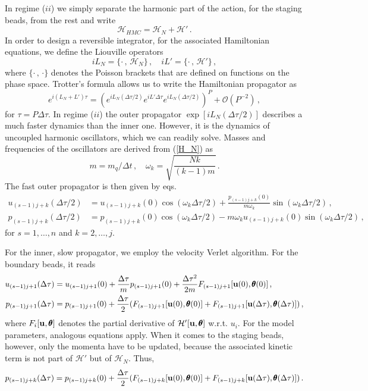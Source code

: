 \documentclass[11pt, a4paper]{article}
\newcommand{\vc}[1]{{\bf #1 }}
\begin{document}
In regime ($ii$) we simply separate the harmonic part of the action, for the staging beads, from the rest and write
\begin{equation}
  \mathcal H_{HMC}=\mathcal H_N + \mathcal H'\,.
\end{equation}
In order to design a reversible integrator, for the associated Hamiltonian equations, we define the Liouville operators
\begin{equation}
  iL_N=\{\cdot\,,\,\mathcal H_N\}\,,\quad
  iL'=\{\cdot\,,\,\mathcal H'\}\,,
\end{equation}
where $\{\cdot\,,\,\cdot\}$ denotes the Poisson brackets that are defined on functions on the phase space.
Trotter's formula allows us to write the Hamiltonian propagator as
\begin{equation}
  e^{i(L_N+L')\tau}
  =
  (e^{iL_N(\Delta\tau/2)}e^{iL'\Delta\tau}e^{iL_N(\Delta\tau/2)})^P
  +
  \mathcal O(P^{-2})\,,
\end{equation}
for $\tau =P\Delta \tau$.
In regime ($ii$) the outer propagator $\exp[iL_N(\Delta \tau/2)]$ describes a much faster dynamics than the inner one.
However, it is the dynamics of uncoupled harmonic oscillators, which we can readily solve.
Masses and frequencies of the oscillators are derived from (\ref{H_N}) as
\begin{equation}
  m=m_q/\Delta t\,,\quad
  \omega_k=\sqrt{\frac{Nk}{(k-1)m}}\,.
\end{equation}
The fast outer propagator is then given by eqs.
\begin{align}
  u_{(s-1)j+k}(\Delta\tau/2)
  &=
  u_{(s-1)j+k}(0)\cos(\omega_k\Delta\tau/2)
  +
  \frac{p_{(s-1)j+k}(0)}{m\omega_k}\sin(\omega_k\Delta\tau/2)\,,\\
  p_{(s-1)j+k}(\Delta\tau/2)
  &=
  p_{(s-1)j+k}(0)\cos(\omega_k\Delta\tau/2)
  -
  m\omega_k u_{(s-1)j+k}(0) \sin(\omega_k\Delta\tau/2)\,,
\end{align}
for $s=1,\dots,n$ and $k=2,\dots,j$.

For the inner, slow propagator, we employ the velocity Verlet algorithm.
For the boundary beads, it reads
\begin{align}
  u_{(s-1)j+1}(\Delta\tau)
  &=
  u_{(s-1)j+1}(0)
  +
  \frac{\Delta\tau}{m} p_{(s-1)j+1}(0)
  +
  \frac{\Delta \tau^2}{2m}
  F_{(s-1)j+1}[\vc u(0),{\pmb\theta}(0)]\,,\\
  p_{(s-1)j+1}(\Delta\tau)
  &=
  p_{(s-1)j+1}(0)
  +
  \frac{\Delta\tau}{2}
  (
  F_{(s-1)j+1}[\vc u(0),{\pmb\theta}(0)]
  +
  F_{(s-1)j+1}[\vc u(\Delta\tau),{\pmb\theta}(\Delta\tau)]
  )\,,
\end{align}
where $F_i[\vc u,{\pmb\theta}]$ denotes the partial derivative of $\mathcal H'[\vc u,{\pmb\theta}]$ w.r.t. $u_i$.
For the model parameters, analogous equations apply.
When it comes to the staging beads, however, only the momenta have to be updated, because the associated kinetic term is not part of $\mathcal H'$ but of $\mathcal H_N$.
Thus,
\begin{equation}
  p_{(s-1)j+k}(\Delta\tau)
  =
  p_{(s-1)j+k}(0)
  +
  \frac{\Delta\tau}{2}
  (
  F_{(s-1)j+k}[\vc u(0),{\pmb\theta}(0)]
  +
  F_{(s-1)j+k}[\vc u(\Delta\tau),{\pmb\theta}(\Delta\tau)]
  )
  \,.
\end{equation}
\end{document}
